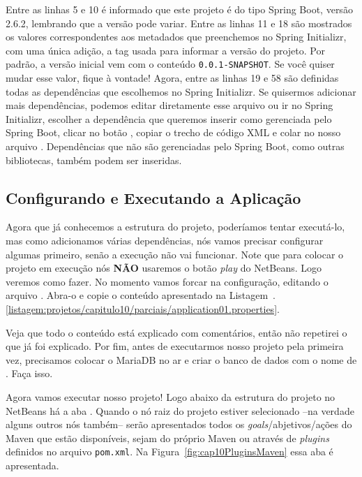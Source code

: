 Entre as linhas 5 e 10 é informado que este projeto é do tipo Spring Boot, versão 2.6.2, lembrando que a versão pode variar. Entre as linhas 11 e 18 são mostrados os valores correspondentes aos metadados que preenchemos no Spring Initializr, com uma única adição, a tag  usada para informar a versão do projeto. Por padrão, a versão inicial vem com o conteúdo \texttt{0.0.1-SNAPSHOT}. Se você quiser mudar esse valor, fique à vontade! Agora, entre as linhas 19 e 58 são definidas todas as dependências que escolhemos no Spring Initializr. Se quisermos adicionar mais dependências, podemos editar diretamente esse arquivo ou ir no Spring Initializr, escolher a dependência que queremos inserir como gerenciada pelo Spring Boot, clicar no botão , copiar o trecho de código XML e colar no nosso arquivo . Dependências que não são gerenciadas pelo Spring Boot, como outras bibliotecas, também podem ser inseridas.


\subsection{Configurando e Executando a Aplicação}

Agora que já conhecemos a estrutura do projeto, poderíamos tentar executá-lo, mas como adicionamos várias dependências, nós vamos precisar configurar algumas primeiro, senão a execução não vai funcionar. Note que para colocar o projeto em execução nós \textbf{NÃO} usaremos o botão \textit{play} do NetBeans. Logo veremos como fazer. No momento vamos forcar na configuração, editando o arquivo . Abra-o e copie o conteúdo apresentado na Listagem~\thechapter.\ref{listagem:projetos/capitulo10/parciais/application01.properties}.


Veja que todo o conteúdo está explicado com comentários, então não repetirei o que já foi explicado. Por fim, antes de executarmos nosso projeto pela primeira vez, precisamos colocar o MariaDB no ar e criar o banco de dados com o nome de . Faça isso.

Agora vamos executar nosso projeto! Logo abaixo da estrutura do projeto no NetBeans há a aba . Quando o nó raiz do projeto estiver selecionado --na verdade alguns outros nós também-- serão apresentados todos os \textit{goals}/abjetivos/ações do Maven que estão disponíveis, sejam do próprio Maven ou através de \textit{plugins} definidos no arquivo \texttt{pom.xml}. Na Figura~\ref{fig:cap10PluginsMaven} essa aba é apresentada.

